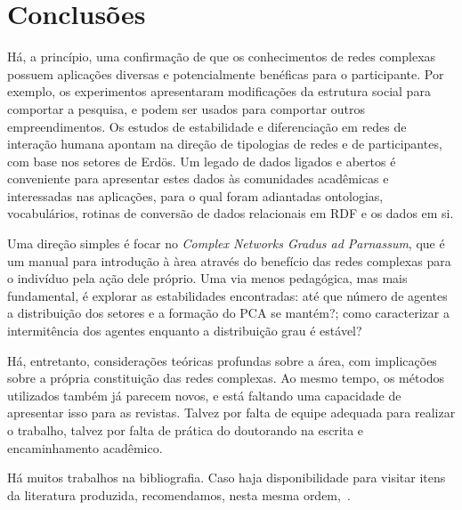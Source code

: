 \documentclass[a4paper,openright,12pt]{report} %
\begin{document}
\chapter{Conclusões}
Há, a princípio, uma confirmação de que os conhecimentos de redes complexas
possuem aplicações diversas e potencialmente benéficas para o participante.
Por exemplo, os experimentos apresentaram modificações da estrutura social para comportar a pesquisa, e podem ser usados para comportar outros empreendimentos. Os estudos de estabilidade e diferenciação em redes de interação humana apontam na direção de tipologias de redes e de participantes, com base nos setores de Erdös.
Um legado de dados ligados e abertos é conveniente para apresentar estes dados às comunidades acadêmicas e interessadas nas aplicações, para o qual foram adiantadas ontologias, vocabulários, rotinas de conversão de dados relacionais em RDF e os dados em si.

Uma direção simples
é focar no \emph{Complex Networks Gradus ad Parnassum},
que é um manual para introdução à àrea através do benefício 
das redes complexas para o indivíduo pela ação dele próprio.
Uma via menos pedagógica, mas mais fundamental, é
explorar as estabilidades encontradas: até que número de
agentes a distribuição dos setores e a formação do PCA se mantém?;
como caracterizar a intermitência dos agentes enquanto a distribuição
grau é estável?

Há, entretanto, considerações teóricas profundas sobre a área,
com implicações sobre a própria constituição das redes complexas.
Ao mesmo tempo, os métodos utilizados também já parecem novos,
e está faltando uma capacidade de apresentar isso para as revistas.
Talvez por falta de equipe adequada para realizar o trabalho,
talvez por falta de prática do doutorando na escrita e encaminhamento
acadêmico.

Há muitos trabalhos na bibliografia.
Caso haja disponibilidade para visitar itens da literatura
produzida, recomendamos, nesta mesma ordem,~\cite{timeS,pnud5,ensaioAA,gmane,fourHubs}.




\end{document}
